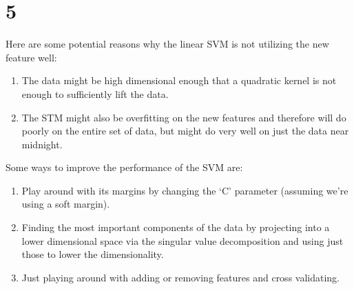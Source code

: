 \documentclass[11pt, parindent=0]{article}
\begin{document}
\section{5}
\label{sec:5}

Here are some potential reasons why the linear SVM is not utilizing the new feature well:
\begin{enumerate}[1.]
    \item The data might be high dimensional enough that a quadratic kernel is not enough to sufficiently lift the data.

    \item The STM might also be overfitting on the new features and therefore will do poorly on the entire set of data, but might do very well on just the data near midnight.

\end{enumerate}


Some ways to improve the performance of the SVM are:
\begin{enumerate}[1.]
    \item Play around with its margins by changing the `C' parameter (assuming we're using a soft margin).

    \item Finding the most important components of the data by projecting into a lower dimensional space via the singular value decomposition and using just those to lower the dimensionality.

    \item Just playing around with adding or removing features and cross validating.
\end{enumerate}
\end{document}
